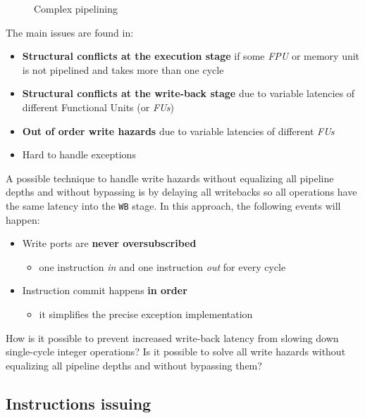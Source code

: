 \documentclass[english]{article}
\begin{document}
\begin{figure}[htbp]
  \bigskip
  \centering
  \caption{Complex pipelining}
  \label{fig:complex-pipelining-2}
  \bigskip
\end{figure}

\bigskip
The main issues are found in:
\begin{itemize}
  \item \textbf{Structural conflicts at the execution stage} if some \textit{FPU} or memory unit is not pipelined and takes more than one cycle
  \item \textbf{Structural conflicts at the write-back stage} due to variable latencies of different Functional Units (or \textit{FUs})
  \item \textbf{Out of order write hazards} due to variable latencies of different \textit{FUs}
  \item Hard to handle exceptions
\end{itemize}

A possible technique to handle write hazards without equalizing all pipeline depths and without bypassing is by delaying all writebacks so all operations have the same latency into the \texttt{WB} stage.
In this approach, the following events will happen:

\begin{itemize}
  \item Write ports are \textbf{never oversubscribed}
        \begin{itemize}
          \item one instruction \textit{in} and one instruction \textit{out} for every cycle
        \end{itemize}
  \item Instruction commit happens \textbf{in order}
        \begin{itemize}
          \item it simplifies the precise exception implementation
        \end{itemize}
\end{itemize}

How is it possible to prevent increased write-back latency from slowing down single-cycle integer operations?
Is it possible to solve all write hazards without equalizing all pipeline depths and without bypassing them?

\subsection{Instructions issuing}
\label{sec:instructions-issuing}
\end{document}
